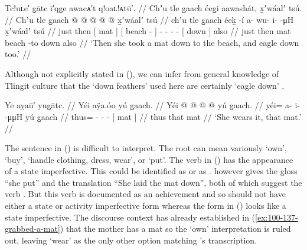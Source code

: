\ex\label{ex:100-137-grabbed-a-mat}%
%
\begingl
	\glpreamble	Tc!uʟe′ g̣ātc ī′qg̣e awacᴀ′t q!oaʟ!ᴀtū′. //
	\glpreamble	Chʼu tle g̱aach éeg̱i aawashát, x̱ʼwáalʼ tsú. //
	\gla	Chʼu tle 
		{} g̱aach {} 
		{}  @ {} {} 
		 @ {} @ {} @ {} @ {}
		{} x̱ʼwáalʼ {} tsú //
	\glb	chʼu tle 
		{} g̱aach {} 
		{} éeḵ -í {} 
		a- wu- i-  -μH
		{} x̱ʼwáalʼ {} tsú //
	\glc	just then
		{}[ mat {}]
		{}[ beach - {}]
		- - -  -
		{}[ down {}] also //
	\gld	just then
		{} mat {}
		{} beach -to {}
		 {} {} {} {}
		{} down {} also //
	\glft	‘Then she took a mat down to the beach, and eagle down too.’
		//
\endgl
\xe

Although not explicitly stated in (\lastx), we can infer from general knowledge of Tlingit culture that the  ‘down feathers’ used here are certainly  ‘eagle down’ \parencites[cf.][432]{de-laguna:1972}.

\ex\label{ex:100-138-wearing-the-mat}%
%
\begingl
	\glpreamble	Ye aỵaū′ yug̣ātc. //
	\glpreamble	Yéi aÿa.óo yú g̱aach. //
	\gla	Yéi @  @ {} @ {} @ {}
		{} yú g̱aach. {} //
	\glb	yéi= a- i-  -μμH
		{} yú g̱aach {} //
	\glc	thus= - -  -
		{}[  mat {}] //
	\gld	thus  {} {} {}
		{} that mat {} //
	\glft	‘She wears it, that mat.’
		//
\endgl
\xe

The sentence in (\lastx) is difficult to interpret.
The root  can mean variously ‘own’, ‘buy’, ‘handle clothing, dress, wear’, or ‘put’.
The verb  in (\lastx) has the appearance of a state imperfective.
This could be identified as  or as .
\citeauthor{swanton:1909} however gives the gloss “she put” and the translation “She laid the mat down”, both of which suggest the verb .
But this verb is documented as an achievement and so should not have either a state or activity imperfective form whereas the form in (\lastx) looks like a state imperfective.
The discourse context has already established in (\ref{ex:100-137-grabbed-a-mat}) that the mother has a mat so the ‘own’ interpretation is ruled out, leaving ‘wear’ as the only other option matching \citeauthor{swanton:1909}’s transcription.

